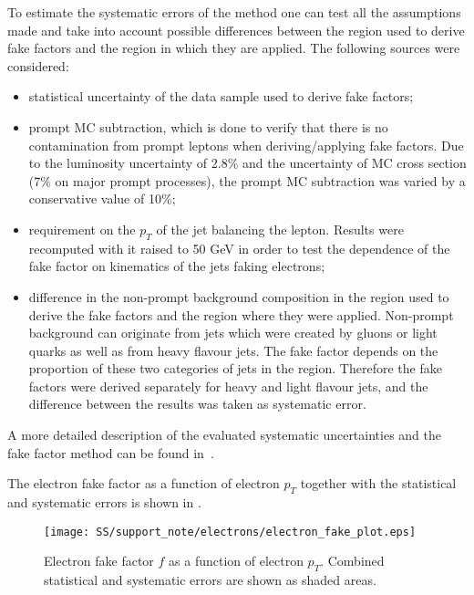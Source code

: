 To estimate the systematic errors of the method one can test all the assumptions made and take into account possible differences between 
the region used to derive fake factors and the region in which they are applied. The following sources were considered:
\begin{itemize}
 \item statistical uncertainty of the data sample used to derive fake factors;
 \item prompt MC subtraction, which is done to verify that there is no contamination from prompt leptons when deriving/applying fake factors.
 Due to the luminosity uncertainty of 2.8$\%$ and the uncertainty of MC cross section (7$\%$ on major prompt processes), the prompt MC subtraction
 was varied by a conservative value of 10$\%$;
 \item requirement on the $p_T$ of the jet balancing the lepton. Results were recomputed with it raised to 50 GeV in order to test the dependence of the fake factor on kinematics of the jets faking electrons;
 \item difference in the non-prompt background composition in the region used to derive the fake factors and the region where they were applied.
 Non-prompt background can originate from jets which were created by gluons or light quarks as well as from heavy flavour jets.
 The fake factor depends on the proportion of these two categories of jets in the region. Therefore the fake factors were derived separately
 for heavy and light flavour jets, and the difference between the results was taken as systematic error.
\end{itemize}
A more detailed description of the evaluated systematic uncertainties and the fake factor method can be found in~\cite{anthony_thesis}.

The electron fake factor as a function of electron $p_T$ together with the statistical and systematic errors is
shown in .
\begin{figure}[h]
\begin{center}
\texttt{[image: SS/support\_note/electrons/electron\_fake\_plot.eps]}
\caption{Electron fake factor $f$ as a function of electron $p_{T}$. Combined statistical and systematic errors are shown as shaded areas.}
\label{fig:ff_e_errs}
\end{center}
\end{figure} 

